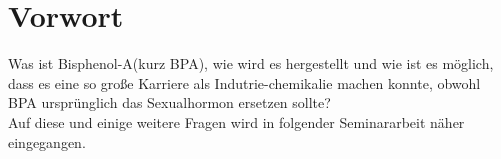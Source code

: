 \section{Vorwort}
Was ist Bisphenol-A(kurz BPA), wie wird es hergestellt und wie ist es möglich, dass es eine 
so große Karriere als Indutrie-chemikalie machen konnte, obwohl BPA ursprünglich
das Sexualhormon \grqq{} ersetzen sollte?\\
Auf diese und einige weitere Fragen wird in folgender Seminararbeit näher eingegangen. 
